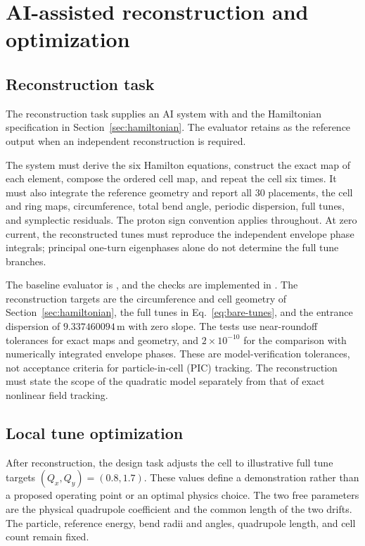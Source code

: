 \documentclass[11pt,a4paper]{article}
\numberwithin{equation}{section}
\newcommand{\units}[1]{\,\mathrm{#1}}
\begin{document}
\section{AI-assisted reconstruction and optimization}
\label{sec:design}

\subsection{Reconstruction task}

The reconstruction task supplies an AI system with
 and the Hamiltonian specification in
Section~\ref{sec:hamiltonian}. The evaluator retains
 as the reference output when an independent
reconstruction is required.

The system must derive the six Hamilton equations, construct the exact
map of each element, compose the ordered cell map, and repeat the cell
six times. It must also integrate the reference geometry and report all
30 placements, the cell and ring maps, circumference, total bend angle,
periodic dispersion, full tunes, and symplectic residuals. The proton
sign convention applies throughout. At zero current, the reconstructed
tunes must reproduce the independent envelope phase integrals; principal
one-turn eigenphases alone do not determine the full tune branches.

The baseline evaluator is , and the checks are
implemented in . The reconstruction targets
are the circumference and cell geometry of Section~\ref{sec:hamiltonian},
the full tunes in Eq.~\eqref{eq:bare-tunes}, and the entrance dispersion
of $9.337460094\units{m}$ with zero slope. The tests use near-roundoff
tolerances for exact maps and geometry, and $2\times10^{-10}$ for the
comparison with numerically integrated envelope phases. These are
model-verification tolerances, not acceptance criteria for
particle-in-cell (PIC) tracking. The reconstruction must state the
scope of the quadratic model separately from that of exact nonlinear
field tracking.

\subsection{Local tune optimization}

After reconstruction, the design task adjusts the cell to illustrative
full tune targets $(Q_x,Q_y)=(0.8,1.7)$. These values define a
demonstration rather than a proposed operating point or an optimal
physics choice. The two free parameters are the physical quadrupole
coefficient and the common length of the two drifts. The particle,
reference energy, bend radii and angles, quadrupole length, and cell
count remain fixed.
\end{document}
